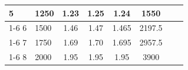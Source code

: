 \documentclass[zihao=5, UTF8]{article}
\theoremstyle{MyLineTheoremStyle} %
\theoremstyle{MyBlockTheoremStyle} %
\theoremstyle{MySubsubsectionStyle} %
\begin{document}
\begin{table}[H]
\begin{tabular}{|l|l|llc|lll|}
		5                                          & 1250                                                                                     & \multicolumn{1}{c|}{1.23}                                               & \multicolumn{1}{c|}{1.25}                                               & 1.24                                                                     & \multicolumn{1}{c|}{1550}                                                                   & \multicolumn{1}{c|}{\multirow{4}{*}{}}                                                        &                                                                                         \\ \cline{1-6}
		6                                          & 1500                                                                                     & \multicolumn{1}{c|}{1.46}                                               & \multicolumn{1}{c|}{1.47}                                               & 1.465                                                                    & \multicolumn{1}{c|}{2197.5}                                                                    & \multicolumn{1}{c|}{}                                                                         &                                                                                         \\ \cline{1-6}
    7                                          & 1750                                                                                     & \multicolumn{1}{c|}{1.69}                                              & \multicolumn{1}{c|}{1.70}                                              & 1.695                                                                    & \multicolumn{1}{c|}{2957.5}                                                                  & \multicolumn{1}{c|}{}                                                                         &                                                                                         \\ \cline{1-6}
		8                                          & 2000                                                                                     & \multicolumn{1}{c|}{1.95}                                              & \multicolumn{1}{c|}{1.95}                                              & 1.95                                                                    & \multicolumn{1}{c|}{3900}                                                                  & \multicolumn{1}{c|}{}                                                                         &                                                                                         \\ \hline

\end{tabular}
\end{table}
\end{document}
